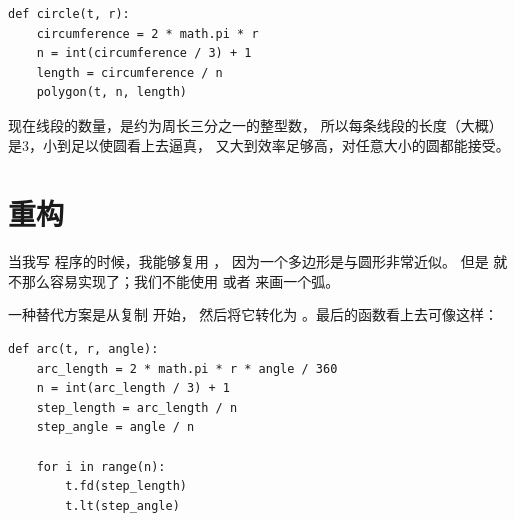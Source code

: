 \begin{lstlisting}
def circle(t, r):
    circumference = 2 * math.pi * r
    n = int(circumference / 3) + 1
    length = circumference / n
    polygon(t, n, length)
\end{lstlisting}

%

现在线段的数量，是约为周长三分之一的整型数，
所以每条线段的长度（大概）是3，小到足以使圆看上去逼真，
又大到效率足够高，对任意大小的圆都能接受。

\section{重构}
\label{refactoring}
  


当我写  程序的时候，我能够复用  ，
因为一个多边形是与圆形非常近似。
但是  就不那么容易实现了；我们不能使用  或者  来画一个弧。


一种替代方案是从复制  开始，
然后将它转化为  。最后的函数看上去可像这样：

\begin{lstlisting}
def arc(t, r, angle):
    arc_length = 2 * math.pi * r * angle / 360
    n = int(arc_length / 3) + 1
    step_length = arc_length / n
    step_angle = angle / n

    for i in range(n):
        t.fd(step_length)
        t.lt(step_angle)
\end{lstlisting}


